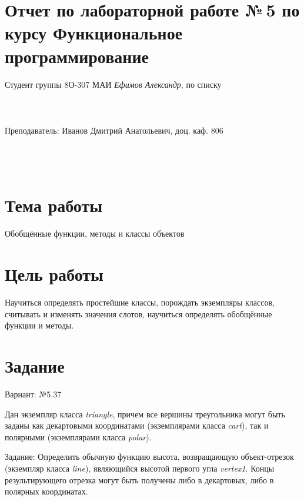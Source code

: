 \documentclass[12pt]{article}
\begin{document}
\section*{Отчет по лабораторной работе №\,5 
по курсу \guillemotleft  Функциональное программирование\guillemotright}
\begin{flushright}
Студент группы 8О-307 МАИ \textit{Ефимов Александр},  по списку \\
 \\
 \\
\ \\
Преподаватель: Иванов Дмитрий Анатольевич, доц. каф. 806 \\
 \\
 \\
 \\

\end{flushright}

\section{Тема работы}
Обобщённые функции, методы и классы объектов

\section{Цель работы}
Научиться определять простейшие классы, порождать экземпляры классов, 
считывать и изменять значения слотов, научиться определять 
обобщённые функции и методы.

\section{Задание}

Вариант: №5.37

Дан экземпляр класса \textit{triangle}, причем все вершины треугольника могут 
быть заданы как декартовыми координатами (экземплярами класса \textit{cart}), 
так и полярными (экземплярами класса \textit{polar}).

Задание: Определить обычную функцию высота, возвращающую объект-отрезок 
(экземпляр класса \textit{line}), являющийся высотой первого угла 
\textit{vertex1}. Концы результирующего отрезка могут быть получены либо в 
декартовых, либо в полярных координатах.
\end{document}
